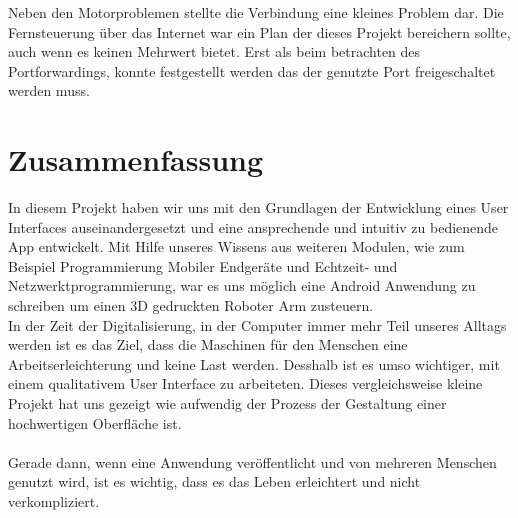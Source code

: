 \documentclass[12pt,					%
							 oneside,			%
							 a4paper,			%
							 halfparskip,		%
							 liststotoc,			%
							 bibtotoc,			%
							 fleqn,				%
							 pointlessnumbers]	%
							 {scrreprt}
\begin{document}
Neben den Motorproblemen stellte die Verbindung eine kleines Problem dar. Die Fernsteuerung über das Internet war ein Plan der dieses Projekt bereichern sollte, auch wenn es keinen Mehrwert bietet. Erst als beim betrachten des Portforwardings, konnte festgestellt werden das der genutzte Port freigeschaltet werden muss.
\chapter{Zusammenfassung}	
In diesem Projekt haben wir uns mit den Grundlagen der Entwicklung eines User Interfaces auseinandergesetzt und eine ansprechende und intuitiv zu bedienende App entwickelt. Mit Hilfe unseres Wissens aus weiteren Modulen, wie zum Beispiel \glqq{}Programmierung Mobiler Endgeräte\grqq{} und \glqq{}Echtzeit- und Netzwerktprogrammierung\grqq{}, war es uns möglich eine Android Anwendung zu schreiben um einen 3D gedruckten Roboter Arm zusteuern. 
\\
In der Zeit der Digitalisierung, in der Computer immer mehr Teil unseres Alltags werden ist es das Ziel, dass die Maschinen für den Menschen eine Arbeitserleichterung und keine Last werden. Desshalb ist es umso wichtiger, mit einem qualitativem User Interface zu arbeiteten. Dieses vergleichsweise kleine Projekt hat uns gezeigt wie aufwendig der Prozess der Gestaltung einer hochwertigen Oberfläche ist.\\ \\
Gerade dann, wenn eine Anwendung veröffentlicht und von mehreren Menschen genutzt wird, ist es wichtig, dass es das Leben erleichtert und nicht verkompliziert.


	
	
	\nocite{*}						%
	

	\listoffigures						%

	\appendix
	
\end{document}
